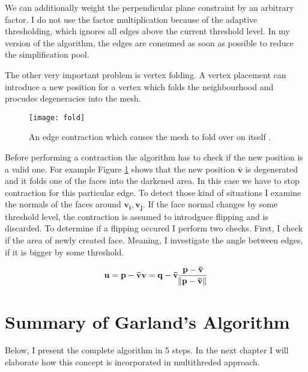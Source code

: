 We can additionally weight the perpendicular plane constraint by an arbitrary factor. I do not use the factor multiplication because of the adaptive thresholding, which ignores all edges above the current threshold level. In my version of the algorithm, the edges are consumed as soon as possible to reduce the simplification pool.

The other very important problem is vertex folding. A vertex placement can introduce a new position for a vertex which folds the neighbourhood and procudes degeneracies into the mesh. 

\begin{figure}[H]
  \begin{center}
    \texttt{[image: fold]}
    \caption{An edge contraction which causes the mesh to fold over on itself \cite{garland99}.}
    \label{fig:fold}
  \end{center}
\end{figure}

Before performing a contraction the algorithm has to check if the new position is a valid one. For example Figure \ref{fig:fold} shows that the new position $\mathbf{\bar{v}}$ is degenerated and it folds one of the faces into the darkened area. In this case we have to stop contraction for this particular edge. To detect those kind of situations I examine the normals of the faces around $\mathbf{v_i}, \mathbf{v_j}$. If the face normal changes by some threshold level, the contraction is assumed to introdguce flipping and is discarded. To determine if a flipping occured I perform two checks. First, I check if the area of newly created face. Meaning, I investigate the angle between edges, if it is bigger by some threshold.

\begin{align}

\mathbf{u} = \mathbf{p} - \mathbf{\bar{v}}
\mathbf{v} = \mathbf{q} - \mathbf{\bar{v}}

\frac{\mathbf{p} - \mathbf{\bar{v}}}{\norm{\mathbf{p} - \mathbf{\bar{v}}}}
\end{align}

\newpage
\section{Summary of Garland's Algorithm}

Below, I present the complete algorithm in 5 steps. In the next chapter I will elaborate how this concept is incorporated in multithreded approach.

